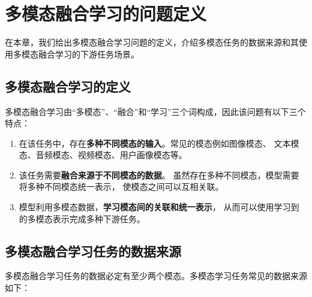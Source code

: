 \chapter{多模态融合学习的问题定义}\label{chap:definition}

在本章，我们给出多模态融合学习问题的定义，介绍多模态任务的数据来源和其使用多模态融合学习的下游任务场景。

\section{多模态融合学习的定义}\label{sec:definition}

多模态融合学习由``多模态''、``融合''和``学习''三个词构成，因此该问题有以下三个特点：

\begin{enumerate}
    \item 在该任务中，存在\textbf{多种不同模态的输入}。常见的模态例如图像模态、
    文本模态、音频模态、视频模态、用户画像模态等。
    \item 该任务需要\textbf{融合来源于不同模态的数据}。
    虽然存在多种不同模态，模型需要将多种不同模态统一表示，
    使模态之间可以互相关联。
    \item 模型利用多模态数据，\textbf{学习模态间的关联和统一表示}，
    从而可以使用学习到的多模态表示完成多种下游任务。
\end{enumerate}

\section{多模态融合学习任务的数据来源}

多模态融合学习任务的数据必定有至少两个模态。多模态学习任务常见的数据来源如下：

